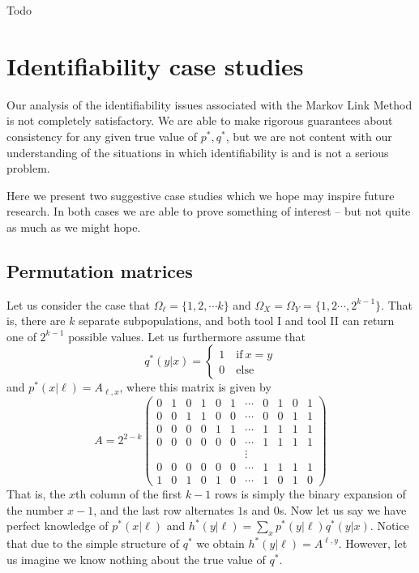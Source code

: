 \begin{itemize}
\label{sec:optproblems}

Todo

\section{Identifiability case studies}

\label{sec:casestudies}

Our analysis of the identifiability issues associated with the Markov Link Method is not completely satisfactory.  We are able to make rigorous guarantees about consistency for any given true value of $p^*,q^*$, but we are not content with our understanding of the situations in which identifiability is and is not a serious problem.  

Here we present two suggestive case studies which we hope may inspire future research.  In both cases we are able to prove something of interest -- but not quite as much as we might hope.  

\subsection{Permutation matrices}

Let us consider the case that $\Omega_\ell = \{1,2,\cdots k\}$ and $\Omega_X=\Omega_Y=\{1,2\cdots,2^{k-1}\}$.  That is, there are $k$ separate subpopulations, and both tool I and tool II can return one of $2^{k-1}$ possible values.  Let us furthermore assume that
\[
q^*(y|x)=\begin{cases}1 \quad \mathrm{if}\ x=y\\0\quad \mathrm{else}\end{cases}
\]
and  $p^*(x|\ell)=A_{\ell,x}$, where this matrix is given by
\[
A=2^{2-k}\left(\begin{array}{ccccccccccc}
0 & 1 & 0 & 1 & 0 & 1 & \cdots & 0 & 1 & 0 & 1\\
0 & 0 & 1 & 1 & 0 & 0 & \cdots & 0 & 0 & 1 & 1\\
0 & 0 & 0 & 0 & 1 & 1 & \cdots & 1 & 1 & 1 & 1\\
0 & 0 & 0 & 0 & 0 & 0 & \cdots & 1 & 1 & 1 & 1\\
 &  &  &  &  &  & \vdots\\
0 & 0 & 0 & 0 & 0 & 0 & \cdots & 1 & 1 & 1 & 1\\
1 & 0 & 1 & 0 & 1 & 0 & \cdots & 1 & 0 & 1 & 0
\end{array}\right)
\]
That is, the $x$th column of the first $k-1$ rows is simply the binary expansion of the number $x-1$, and the last row alternates $1$s and $0$s.  Now let us say we have perfect knowledge of $p^*(x|\ell)$ and $h^*(y|\ell)=\sum_x p^*(y|\ell)q^*(y|x)$.  Notice that due to the simple structure of $q^*$ we obtain $h^*(y|\ell)=A^{\ell,y}$.  However, let us imagine we know nothing about the true value of $q^*$.  


\end{itemize}
